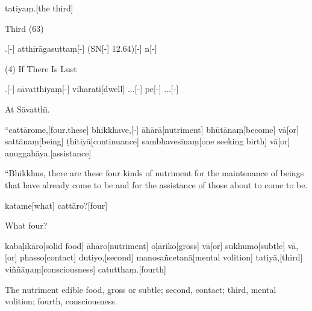 \vskip 0.2in
\begin{samepage}
\begingl[glneveryline={\PaliGlossA,\PaliGlossB}]
tatiyaṃ.[the third]
\endgl
\nopagebreak
\linespread{0.5}
\begin{spacin}{0.2}
{\PaliGlossFT Third (63)}
\end{spacin}
\vskip 12pt
\end{samepage}
\vskip 0.2in
\begin{samepage}
.[-] atthirāgasuttaṃ[-] (SN[-] 12.64)[-] n[-]
\endgl
\nopagebreak
\linespread{0.5}
\begin{spacin}{0.2}
{ (4) If There Is Lust}
\end{spacin}
\vskip 12pt
\end{samepage}
\vskip 0.2in
\begin{samepage}
.[-] sāvatthiyaṃ[-] viharati[dwell] ...[-] pe[-] ...[-]
\endgl
\nopagebreak
\linespread{0.5}
\begin{spacin}{0.2}
{\PaliGlossFT At Sāvatthı̄.}
\end{spacin}
\vskip 12pt
\end{samepage}
\begin{samepage}
\begingl[glneveryline={\PaliGlossA,\PaliGlossB}]
“cattārome,[four.these] bhikkhave,[-] āhārā[nutriment] bhūtānaṃ[become] vā[or] sattānaṃ[being] ṭhitiyā[continuance] sambhavesīnaṃ[one seeking birth] vā[or] anuggahāya.[assistance]
\endgl
\nopagebreak
\linespread{0.5}
\begin{spacin}{0.2}
{\PaliGlossFT “Bhikkhus, there are these four kinds of nutriment for the maintenance of beings that have already come to be and for the assistance of those about to come to be.}
\end{spacin}
\vskip 12pt
\end{samepage}
\begin{samepage}
\begingl[glneveryline={\PaliGlossA,\PaliGlossB}]
katame[what] cattāro?[four]
\endgl
\nopagebreak
\linespread{0.5}
\begin{spacin}{0.2}
{\PaliGlossFT What four?}
\end{spacin}
\vskip 12pt
\end{samepage}
\begin{samepage}
\begingl[glneveryline={\PaliGlossA,\PaliGlossB}]
kabaḷīkāro[solid food] āhāro[nutriment] oḷāriko[gross] vā[or] sukhumo[subtle] vā,[or] phasso[contact] dutiyo,[second] manosañcetanā[mental volition] tatiyā,[third] viññāṇaṃ[consciousness] catutthaṃ.[fourth]
\endgl
\nopagebreak
\linespread{0.5}
\begin{spacin}{0.2}
{\PaliGlossFT The nutriment edible food, gross or subtle; second, contact; third, mental volition; fourth, consciousness.}
\end{spacin}
\vskip 12pt
\end{samepage}
